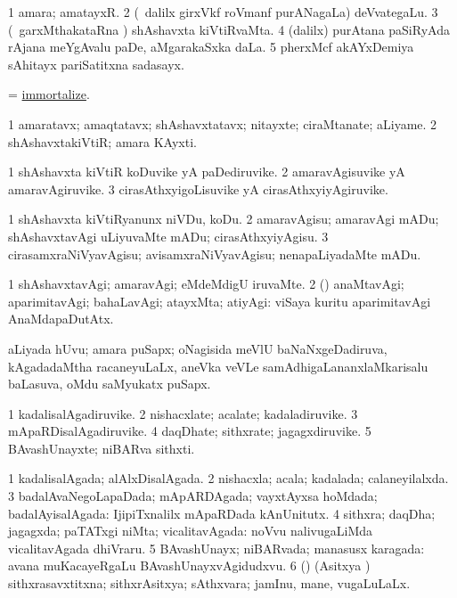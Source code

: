 \bentry
{}
\gl{\nA}
\bmng
\bnum
\num{1} amara; amatayxR. 
\num{2} (\kanmu\ \bava dalilx girxVkf roVmanf purANagaLa) deVvategaLu. 
\num{3} (\kanmu\ garxMthakataRna \vi) shAshavxta kiVtiRvaMta. 
\num{4} (\bava dalilx) purAtana paSiRyAda rAjana meYgAvalu paDe, aMgarakaSxka daLa. 
\num{5}  pherxMcf akAYxDemiya sAhitayx pariSatitxna sadasayx. 
\enum
\emng
\eentry

\bentry
{}
\gl{\sakirx}
\bmng
 = \hyperlink{immortalize}{immortalize}. 
\emng
\eentry

\bentry
{}
\gl{\nA}
\bmng
\bnum
\num{1} amaratavx; amaqtatavx; shAshavxtatavx; nitayxte; ciraMtanate; aLiyame. 
\num{2} shAshavxtakiVtiR; amara KAyxti. 
\enum
\emng
\eentry

\bentry
{}
\gl{\nA}
\bmng
\bnum
\num{1} shAshavxta kiVtiR koDuvike yA paDediruvike. 
\num{2} amaravAgisuvike yA amaravAgiruvike. 
\num{3} cirasAthxyigoLisuvike yA cirasAthxyiyAgiruvike. 
\enum
\emng
\eentry

\bentry
{}
\gl{\sakirx}
\bmng
\bnum
\num{1} shAshavxta kiVtiRyanunx niVDu, koDu. 
\num{2} amaravAgisu; amaravAgi mADu; shAshavxtavAgi uLiyuvaMte mADu; cirasAthxyiyAgisu. 
\num{3} cirasamxraNiVyavAgisu; avisamxraNiVyavAgisu; nenapaLiyadaMte mADu. 
\enum
\emng
\eentry

\bentry
{}
\gl{\kirxvi}
\bmng
\bnum
\num{1} shAshavxtavAgi; amaravAgi; eMdeMdigU iruvaMte. 
\num{2} (\AmA) anaMtavAgi; aparimitavAgi; bahaLavAgi; atayxMta; atiyAgi:  viSaya kuritu aparimitavAgi AnaMdapaDutAtx. 
\enum
\emng
\eentry

\bentry
{}
\gl{\nA}
\bmng
aLiyada hUvu; amara puSapx; oNagisida meVlU baNaNxgeDadiruva, kAgadadaMtha racaneyuLaLx, aneVka veVLe samAdhigaLananxlaMkarisalu baLasuva, oMdu saMyukatx puSapx. 
\emng
\eentry

\bentry
{}
\gl{\nA}
\bmng
\bnum
\num{1} kadalisalAgadiruvike. 
\num{2} nishacxlate; acalate; kadaladiruvike. 
\num{3} mApaRDisalAgadiruvike. 
\num{4} daqDhate; sithxrate; jagagxdiruvike. 
\num{5} BAvashUnayxte; niBARva sithxti. 
\enum
\emng
\eentry

\bentry
{}
\gl{\gu}
\bmng
\bnum
\num{1} kadalisalAgada; alAlxDisalAgada. 
\num{2} nishacxla; acala; kadalada; calaneyilalxda. 
\num{3} badalAvaNegoLapaDada; mApARDAgada; vayxtAyxsa hoMdada; badalAyisalAgada:  IjipiTxnalilx mApaRDada kAnUnitutx. 
\num{4} sithxra; daqDha; jagagxda; paTATxgi niMta; vicalitavAgada:  noVvu nalivugaLiMda vicalitavAgada dhiVraru. 
\num{5} BAvashUnayx; niBARvada; manasusx karagada:  avana muKacayeRgaLu BAvashUnayxvAgidudxvu. 
\num{6} (\nAyxshA) (Asitxya \vi) sithxrasavxtitxna; sithxrAsitxya; sAthxvara; jamInu, mane, \mo vugaLuLaLx. 
\enum
\emng
\eentry

